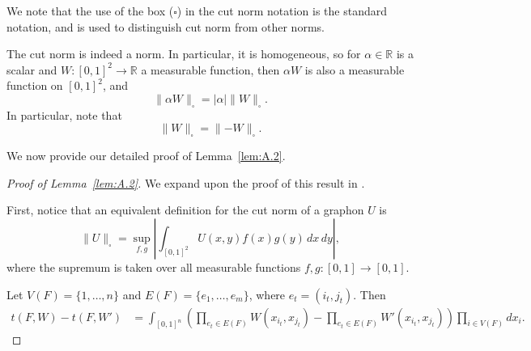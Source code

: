 We note that the use of the box ($\square$) in the cut norm notation is the standard notation, and is used to distinguish cut norm from other norms.

\begin{remark}
The cut norm is indeed a norm. In particular, it is homogeneous, so for $\alpha\in \mathbb{R}$ is a scalar and $W:[0,1]^2\to\mathbb{R}$ a measurable function, then $\alpha W$ is also a measurable function on $[0,1]^2$, and 
\[\lVert \alpha W\rVert_\square = |\alpha|\lVert W\rVert_\square.\]
In particular, note that
\[\lVert W\rVert_\square = \lVert -W\rVert_\square.\]
\end{remark}

We now provide our detailed proof of Lemma~\ref{lem:A.2}.

\begin{proof}[Proof of Lemma~\ref{lem:A.2}]
We expand upon the proof of this result in \cite[Lemma 4.1]{Lovasz:2006}.

First, notice that an equivalent definition for the cut norm of a graphon $U$ is
\begin{equation}\label{eqn:cut norm equiv defn}
    \lVert U\rVert_\square=\sup_{f,g}\left|\int_{[0,1]^2}U(x,y)f(x)g(y)\,dx\,dy\right|,
\end{equation}
where the supremum is taken over all measurable functions $f,g:[0,1]\to [0,1]$.

Let $V(F)=\{1,\ldots,n\}$ and $E(F)=\{e_1,\ldots,e_m\}$, where $e_t=(i_t,j_t)$. Then
\begin{align*}
    t(F,W)-t(F,W')&=\int_{[0,1]^n}\left(\prod_{e_t\in E(F)}W(x_{i_t},x_{j_t})-\prod_{e_t\in E(F)}W'(x_{i_t},x_{j_t})\right)\prod_{i\in V(F)}dx_i.
\end{align*}


\end{proof}
